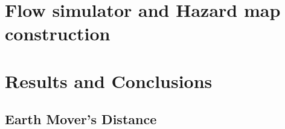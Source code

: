 \documentclass[12pt,letterpaper]{article}
\begin{document}
\section{Flow simulator and Hazard map construction}

\section{Results and Conclusions}
\subsection{Earth Mover's Distance}

%
%
%
%
 
\end{document}
